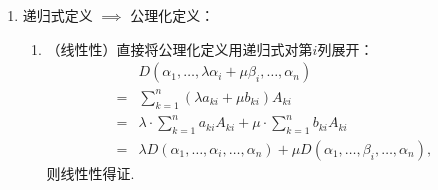 \begin{exercise}
\begin{exgroup}
\begin{answer}
\begin{enumerate}
                \item 递归式定义 $\implies$ 公理化定义：
                    \begin{enumerate}
                        \item （线性性）直接将公理化定义用递归式对第$i$列展开：
                            \begin{align*}
                                    & D(\alpha_1,\ldots,\lambda\alpha_{i}+\mu\beta_i,\ldots,\alpha_n)                                      \\
                                ={} & \sum_{k=1}^{n}(\lambda a_{ki}+\mu b_{ki})A_{ki}                                                      \\
                                ={} & \lambda \cdot \sum_{k=1}^{n}a_{ki}A_{ki}+\mu \cdot \sum_{k=1}^{n}b_{ki}A_{ki}                        \\
                                ={} & \lambda D(\alpha_1,\ldots,\alpha_{i},\ldots,\alpha_n)+\mu D(\alpha_1,\ldots,\beta_i,\ldots,\alpha_n),
                            \end{align*}
                            则线性性得证.


\end{enumerate}
\end{enumerate}
\end{answer}
\end{exgroup}
\end{exercise}
